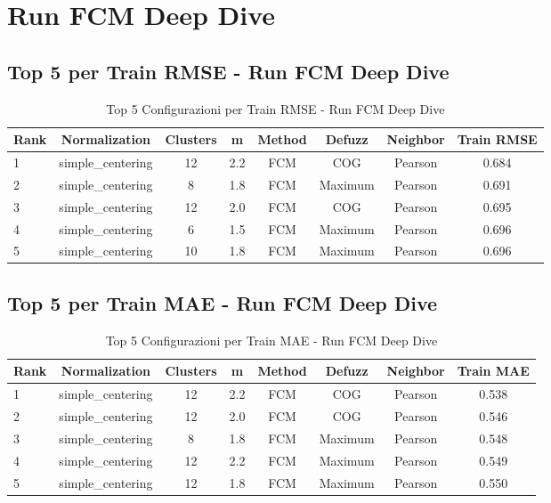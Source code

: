 \section{Run FCM Deep Dive}

\subsection{Top 5 per Train RMSE - Run FCM Deep Dive}
\begin{table}[h]
    \centering
    \caption{Top 5 Configurazioni per Train RMSE - Run FCM Deep Dive}
    \begin{tabular}{|l|c|c|c|c|c|c|c|}
    \hline
    \textbf{Rank} & \textbf{Normalization} & \textbf{Clusters} & \textbf{m} & \textbf{Method} & \textbf{Defuzz} & \textbf{Neighbor} & \textbf{Train RMSE} \\
    \hline
    1 & simple\_centering & 12 & 2.2 & FCM & COG & Pearson & 0.684 \\
    2 & simple\_centering & 8 & 1.8 & FCM & Maximum & Pearson & 0.691 \\
    3 & simple\_centering & 12 & 2.0 & FCM & COG & Pearson & 0.695 \\
    4 & simple\_centering & 6 & 1.5 & FCM & Maximum & Pearson & 0.696 \\
    5 & simple\_centering & 10 & 1.8 & FCM & Maximum & Pearson & 0.696 \\
    \hline
    \end{tabular}
    \end{table}

\subsection{Top 5 per Train MAE - Run FCM Deep Dive}
\begin{table}[h]
    \centering
    \caption{Top 5 Configurazioni per Train MAE - Run FCM Deep Dive}
    \begin{tabular}{|l|c|c|c|c|c|c|c|}
    \hline
    \textbf{Rank} & \textbf{Normalization} & \textbf{Clusters} & \textbf{m} & \textbf{Method} & \textbf{Defuzz} & \textbf{Neighbor} & \textbf{Train MAE} \\
    \hline
    1 & simple\_centering & 12 & 2.2 & FCM & COG & Pearson & 0.538 \\
    2 & simple\_centering & 12 & 2.0 & FCM & COG & Pearson & 0.546 \\
    3 & simple\_centering & 8 & 1.8 & FCM & Maximum & Pearson & 0.548 \\
    4 & simple\_centering & 12 & 2.2 & FCM & Maximum & Pearson & 0.549 \\
    5 & simple\_centering & 12 & 1.8 & FCM & Maximum & Pearson & 0.550 \\
    \hline
    \end{tabular}
    \end{table}

